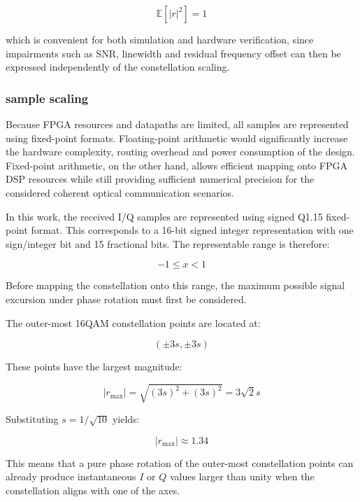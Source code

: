 \begin{equation}
\mathbb{E}[|r|^2] = 1
\end{equation}

which is convenient for both simulation and hardware verification, since impairments such as \ac{SNR}, linewidth and residual
frequency offset can then be expressed independently of the constellation scaling.

\subsubsection{sample scaling}
Because FPGA resources and datapaths are limited, all samples are represented using fixed-point formats. Floating-point arithmetic would significantly increase the hardware complexity, routing overhead and power consumption
of the design. Fixed-point arithmetic, on the other hand, allows efficient mapping onto FPGA DSP resources while still providing
sufficient numerical precision for the considered coherent optical communication scenarios.

In this work, the received \ac{I/Q} samples are represented using signed Q1.15 fixed-point format. This corresponds to a
16-bit signed integer representation with one sign/integer bit and 15 fractional bits. The representable range is therefore:

\begin{equation}
-1 \leq x < 1
\end{equation}

Before mapping the constellation onto this range, the maximum possible signal excursion under phase rotation must first be considered.

The outer-most 16QAM constellation points are located at:

\begin{equation}
(\pm 3s,\pm 3s)
\end{equation}

These points have the largest magnitude:

\begin{equation}
|r_{\text{max}}| = \sqrt{(3s)^2 + (3s)^2}
= 3\sqrt{2}s
\end{equation}

Substituting $s = 1/\sqrt{10}$ yields:

\begin{equation}
|r_{\text{max}}| \approx 1.34
\end{equation}

This means that a pure phase rotation of the outer-most constellation points can already produce instantaneous
$I$ or $Q$ values larger than unity when the constellation aligns with one of the axes.

